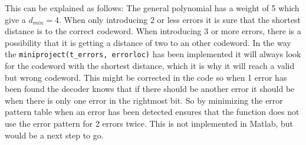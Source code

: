 \documentclass[Main]{subfiles}
\begin{document}
This can be explained as follows:
The general polynomial has a weight of 5 which give a $d_{min}=4$.
When only introducing 2 or less errors it is sure that the shortest distance is to the correct codeword.
When introducing 3 or more errors, there is a possibility that it is getting a distance of two to an other codeword.
In the way the \texttt{miniproject(t\_errors, errorloc)} has been implemented it will always look for the codeword with the shortest distance, which it is why it will reach a valid but wrong codeword.
This might be corrected in the code so when 1 error has been found the decoder knows that if there should be another error it should be when there is only one error in the rightmost bit.
So by minimizing the error pattern table when an error has been detected ensures that the function does not use the error pattern for 2 errors twice.
This is not implemented in Matlab, but would be a next step to go. 
\end{document}
